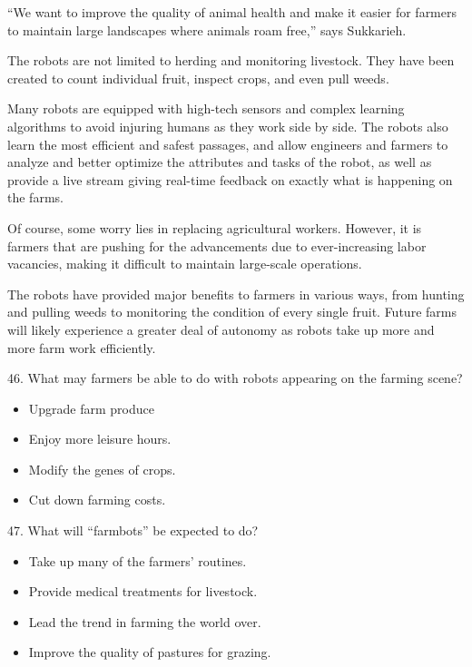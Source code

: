 \documentclass[UTF8,11pt]{ctexart}
\begin{document}
“We want to improve the quality of animal health and make it easier for farmers to maintain large landscapes where animals roam free,” says Sukkarieh.


The robots are not limited to herding and monitoring livestock. They have been created to count individual fruit, inspect crops, and even pull weeds.


Many robots are equipped with high-tech sensors and complex learning algorithms to avoid injuring humans as they work side by side. The robots also learn the most efficient and safest passages, and allow engineers and farmers to analyze and better optimize the attributes and tasks of the robot, as well as provide a live stream giving real-time feedback on exactly what is happening on the farms.


Of course, some worry lies in replacing agricultural workers. However, it is farmers that are pushing for the advancements due to ever-increasing labor vacancies, making it difficult to maintain large-scale operations.


The robots have provided major benefits to farmers in various ways, from hunting and pulling weeds to monitoring the condition of every single fruit. Future farms will likely experience a greater deal of autonomy as robots take up more and more farm work efficiently.


46. What may farmers be able to do with robots appearing on the farming scene?


\begin{itemize}[leftmargin=2em,itemsep=.2em,topsep=.4em]\item[A.] Upgrade farm produce
\item[B.] Enjoy more leisure hours.
\item[C.] Modify the genes of crops.
\item[D.] Cut down farming costs.
\end{itemize}

47. What will “farmbots” be expected to do?


\begin{itemize}[leftmargin=2em,itemsep=.2em,topsep=.4em]\item[A.] Take up many of the farmers’ routines.
\item[B.] Provide medical treatments for livestock.
\item[C.] Lead the trend in farming the world over.
\item[D.] Improve the quality of pastures for grazing.
\end{itemize}
\end{document}
